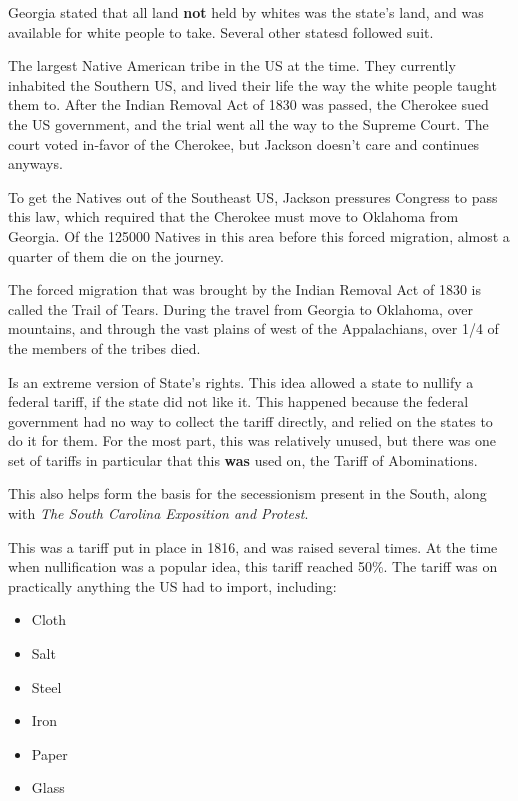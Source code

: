 \begin{description}
\begin{description}[noitemsep]
    Georgia stated that all land \textbf{not} held by whites was the state's land, and was available for white people to take.
    Several other statesd followed suit.

  \item[Cherokee] The largest Native American tribe in the US at the time.
    They currently inhabited the Southern US, and lived their life the way the white people taught them to.
    After the Indian Removal Act of 1830 was passed, the Cherokee sued the US government, and the trial went all the way to the Supreme Court.
    The court voted in-favor of the Cherokee, but Jackson doesn't care and continues anyways.

  \item[Indian Removal Act of 1830] To get the Natives out of the Southeast US, Jackson pressures Congress to pass this law, which required that the Cherokee must move to Oklahoma from Georgia.
    Of the 125000 Natives in this area before this forced migration, almost a quarter of them die on the journey.

  \item[Trail of Tears] The forced migration that was brought by the Indian Removal Act of 1830 is called the Trail of Tears.
    During the travel from Georgia to Oklahoma, over mountains, and through the vast plains of west of the Appalachians, over 1/4 of the members of the tribes died.

  \item[Nullification] Is an extreme version of State's rights.
    This idea allowed a state to nullify a federal tariff, if the state did not like it.
    This happened because the federal government had no way to collect the tariff directly, and relied on the states to do it for them.
    For the most part, this was relatively unused, but there was one set of tariffs in particular that this \textbf{was} used on, the Tariff of Abominations.

    This also helps form the basis for the secessionism present in the South, along with \textit{The South Carolina Exposition and Protest}.

  \item[Tariff of Abominations] This was a tariff put in place in 1816, and was raised several times.
    At the time when nullification was a popular idea, this tariff reached 50\%.
    The tariff was on practically anything the US had to import, including:
    \begin{itemize}[noitemsep]
    \item Cloth
    \item Salt
    \item Steel
    \item Iron
    \item Paper
    \item Glass
    \end{itemize}


\end{description}
\end{description}

